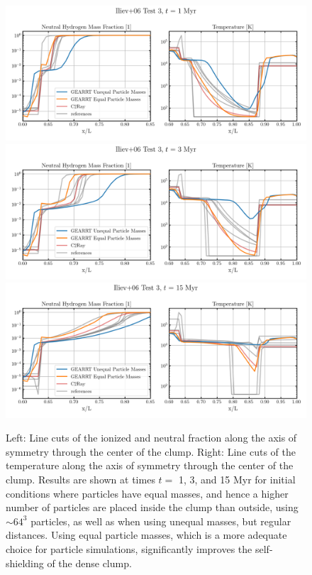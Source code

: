 \begin{figure}
 \centering
 \includegraphics[width=\textwidth]{figures/RHD/Iliev3/output_0001EqualMass-Profiles.png}\\%
 \includegraphics[width=\textwidth]{figures/RHD/Iliev3/output_0003EqualMass-Profiles.png}\\%
 \includegraphics[width=\textwidth]{figures/RHD/Iliev3/output_0015EqualMass-Profiles.png}\\%
 \caption{
Left: Line cuts of the ionized and neutral fraction along the axis of symmetry through the center
of the clump. Right: Line cuts of the temperature along the axis of symmetry through the center of
the clump. Results are shown at times $t=$ 1, 3, and 15 Myr for initial conditions where particles
have equal masses, and hence a higher number of particles are placed inside the clump than outside,
using $\sim 64^3$ particles, as well as when using unequal masses, but regular distances. Using
equal particle masses, which is a more adequate choice for particle simulations, significantly
improves the self-shielding of the dense clump.
 }
\label{fig:iliev3-equal-mass-profiles}
\end{figure}




